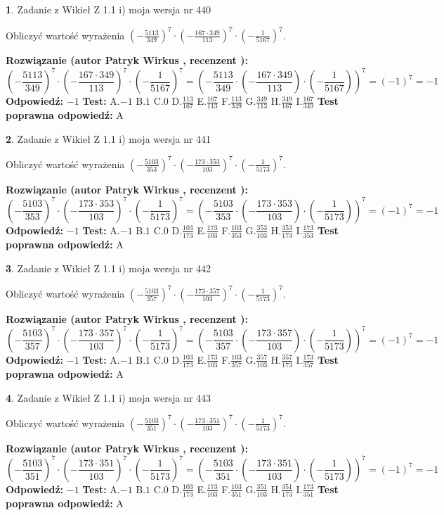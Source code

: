\documentclass[12pt, a4paper]{article}
\theoremstyle{definition} %
\newtheorem{zad}{}
\newcommand{\zadStart}[1]{\begin{zad}#1\newline}
\newcommand{\zadStop}{\end{zad}}
\newcommand{\rozwStart}[2]{\noindent \textbf{Rozwiązanie (autor #1 , recenzent #2): }\newline}
\newcommand{\rozwStop}{\newline}
\newcommand{\odpStart}{\noindent \textbf{Odpowiedź:}\newline}
\newcommand{\odpStop}{\newline}
\newcommand{\testStart}{\noindent \textbf{Test:}\newline}
\newcommand{\testStop}{\newline}
\newcommand{\kluczStart}{\noindent \textbf{Test poprawna odpowiedź:}\newline}
\newcommand{\kluczStop}{\newline}
\begin{document}
\zadStart{Zadanie z Wikieł Z 1.1 i) moja wersja nr 440}

Obliczyć wartość wyrażenia $(-\frac{5113}{349})^{7} \cdot (-\frac{167 \cdot 349}{113})^{7} \cdot (-\frac{1}{5167})^{7}$.
\zadStop
\rozwStart{Patryk Wirkus}{}
$$(-\frac{5113}{349})^{7} \cdot (-\frac{167 \cdot 349}{113})^{7} \cdot (-\frac{1}{5167})^{7} = (-\frac{5113}{349} \cdot (-\frac{167 \cdot 349}{113}) \cdot (-\frac{1}{5167}))^{7} = (-1)^{7} = -1$$
\rozwStop
\odpStart
$-1$
\odpStop
\testStart
A.$-1$ B.$1$ C.$0$ D.$\frac{113}{167}$ E.$\frac{167}{113}$
F.$\frac{113}{349}$ G.$\frac{349}{113}$
H.$\frac{349}{167}$
I.$\frac{167}{349}$
\testStop
\kluczStart
A
\kluczStop



\zadStart{Zadanie z Wikieł Z 1.1 i) moja wersja nr 441}

Obliczyć wartość wyrażenia $(-\frac{5103}{353})^{7} \cdot (-\frac{173 \cdot 353}{103})^{7} \cdot (-\frac{1}{5173})^{7}$.
\zadStop
\rozwStart{Patryk Wirkus}{}
$$(-\frac{5103}{353})^{7} \cdot (-\frac{173 \cdot 353}{103})^{7} \cdot (-\frac{1}{5173})^{7} = (-\frac{5103}{353} \cdot (-\frac{173 \cdot 353}{103}) \cdot (-\frac{1}{5173}))^{7} = (-1)^{7} = -1$$
\rozwStop
\odpStart
$-1$
\odpStop
\testStart
A.$-1$ B.$1$ C.$0$ D.$\frac{103}{173}$ E.$\frac{173}{103}$
F.$\frac{103}{353}$ G.$\frac{353}{103}$
H.$\frac{353}{173}$
I.$\frac{173}{353}$
\testStop
\kluczStart
A
\kluczStop



\zadStart{Zadanie z Wikieł Z 1.1 i) moja wersja nr 442}

Obliczyć wartość wyrażenia $(-\frac{5103}{357})^{7} \cdot (-\frac{173 \cdot 357}{103})^{7} \cdot (-\frac{1}{5173})^{7}$.
\zadStop
\rozwStart{Patryk Wirkus}{}
$$(-\frac{5103}{357})^{7} \cdot (-\frac{173 \cdot 357}{103})^{7} \cdot (-\frac{1}{5173})^{7} = (-\frac{5103}{357} \cdot (-\frac{173 \cdot 357}{103}) \cdot (-\frac{1}{5173}))^{7} = (-1)^{7} = -1$$
\rozwStop
\odpStart
$-1$
\odpStop
\testStart
A.$-1$ B.$1$ C.$0$ D.$\frac{103}{173}$ E.$\frac{173}{103}$
F.$\frac{103}{357}$ G.$\frac{357}{103}$
H.$\frac{357}{173}$
I.$\frac{173}{357}$
\testStop
\kluczStart
A
\kluczStop



\zadStart{Zadanie z Wikieł Z 1.1 i) moja wersja nr 443}

Obliczyć wartość wyrażenia $(-\frac{5103}{351})^{7} \cdot (-\frac{173 \cdot 351}{103})^{7} \cdot (-\frac{1}{5173})^{7}$.
\zadStop
\rozwStart{Patryk Wirkus}{}
$$(-\frac{5103}{351})^{7} \cdot (-\frac{173 \cdot 351}{103})^{7} \cdot (-\frac{1}{5173})^{7} = (-\frac{5103}{351} \cdot (-\frac{173 \cdot 351}{103}) \cdot (-\frac{1}{5173}))^{7} = (-1)^{7} = -1$$
\rozwStop
\odpStart
$-1$
\odpStop
\testStart
A.$-1$ B.$1$ C.$0$ D.$\frac{103}{173}$ E.$\frac{173}{103}$
F.$\frac{103}{351}$ G.$\frac{351}{103}$
H.$\frac{351}{173}$
I.$\frac{173}{351}$
\testStop
\kluczStart
A
\kluczStop
\end{document}
